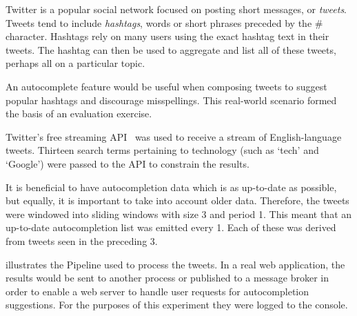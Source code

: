 Twitter is a popular social network focused on posting short messages, or \emph{tweets}.
Tweets tend to include \emph{hashtags}, words or short phrases preceded by the \# character.
Hashtags rely on many users using the exact hashtag text in their tweets.
The hashtag can then be used to aggregate and list all of these tweets, perhaps all on a particular topic.

An autocomplete feature would be useful when composing tweets to suggest popular hashtags and discourage misspellings.
This real-world scenario formed the basis of an evaluation exercise.

Twitter's free streaming API~\cite{TwitterStreamingAPI} was used to receive a stream of English-language tweets.
Thirteen search terms pertaining to technology (such as `tech' and `Google') were passed to the API to constrain the results.

It is beneficial to have autocompletion data which is as up-to-date as possible, but equally, it is important to take into account older data.
Therefore, the tweets were windowed into sliding windows with size \SI{3}{\min} and period \SI{1}{\min}.
This meant that an up-to-date autocompletion list was emitted every \SI{1}{\min}.
Each of these was derived from tweets seen in the preceding \SI{3}{\min}.

 illustrates the Pipeline used to process the tweets.
In a real web application, the results would be sent to another process or published to a message broker in order to enable a web server to handle user requests for autocompletion suggestions.
For the purposes of this experiment they were logged to the console.

